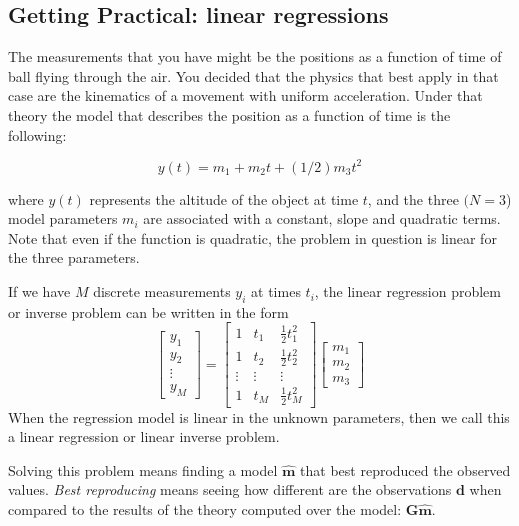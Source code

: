 \documentclass{article}
\begin{document}
\subsection{Getting Practical: linear regressions}

The measurements that you have might be the positions as a function of time of ball flying through the air. You decided that the physics that best apply in that case are the kinematics of a movement with uniform acceleration. Under that theory the model that describes the position as a function of time is the following:

\begin{equation}
y(t) = m_1 + m_2 t + (1/2) m_3 t^2
\end{equation}

where $y(t)$ represents the altitude of the object at time $t$, and the three $(N=3$) model parameters $m_i$ are associated with a constant, slope and quadratic terms. Note that even if the function is quadratic, the problem in question is linear for the three parameters. 

If we have $M$ discrete measurements $y_i$ at times $t_i$, the linear regression problem or inverse problem can be written in the form
\begin{equation}
\left[
\begin{array}{c}
  y_1   \\
  y_2   \\
  \vdots \\
  y_M
\end{array}
\right] = 
\left[
\begin{array}{ccc}
  1 & t_1 & {\scriptstyle{\frac{1}{2}}}t_1^2 \\
  1  &t_2 &  {\scriptstyle{\frac{1}{2}}}t_2^2\\
  \vdots & \vdots  & \vdots\\
  1 & t_M &  {\scriptstyle{\frac{1}{2}}}t_M^2
\end{array}
\right]
\left[
\begin{array}{c}
  m_1   \\
  m_2    \\
  m_3
\end{array}
\right] 
\end{equation}
When the regression model is linear in the unknown parameters, then we call this a linear regression or linear inverse problem. 

Solving this problem means finding a model $\mathbf{\hat{m}}$ that best reproduced the observed values. \emph{Best reproducing} means seeing how different are the observations $\mathbf{d}$ when compared to the results of the theory computed over the model: $\mathbf{G} \mathbf{\hat{m}}$.
\end{document}
